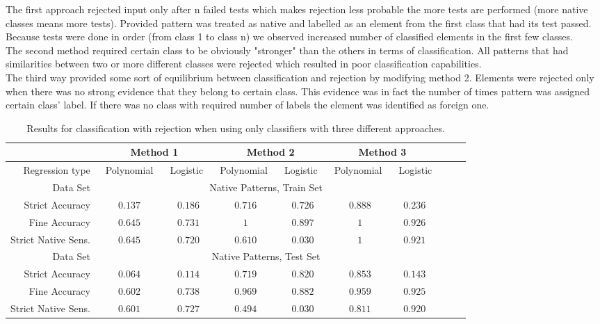 \documentclass{llncs}
\begin{document}
The first approach rejected input only after n failed tests which makes rejection less probable the more tests are performed (more native classes means more tests). Provided pattern was treated as native and labelled as an element from the first class that had its test passed. Because tests were done in order (from class 1 to class n) we observed increased number of classified elements in the first few classes.\\

The second method required certain class to be obviously "stronger" than the others in terms of classification. All patterns that had similarities between two or more different classes were rejected which resulted in poor classification capabilities. \\

The third way provided some sort of equilibrium between classification and rejection by modifying method 2. Elements were rejected only when there was no strong evidence that they belong to certain class. This evidence was in fact the number of times pattern was assigned certain class' label. If there was no class with required number of labels the element was identified as foreign one.

\begin{table}[!b]
	\vspace{-12pt}
	\centering
	\caption{Results for classification with rejection when using only classifiers with three different approaches.}
	\vspace{-6pt}
	\setlength{\tabcolsep}{3pt}
	\renewcommand{\arraystretch}{1}
	{\footnotesize
		\begin{tabular}{|r||c|c|c||c|c|c||c|c|c|}
			\hline
			& \multicolumn{2}{c||}{Method 1} & \multicolumn{2}{c||}{Method 2} & \multicolumn{2}{c|}{Method 3}\\
			\hline
			Regression type & $\;\;$Polynomial$\;\;$ & $\,$Logistic$\;\;$ & $\,$Polynomial$\;\;$ & $\,$Logistic$\;\;$ & $\,$Polynomial$\;\;$ & $\,$Logistic  \\
			\hline
			Data Set & \multicolumn{6}{c|}{Native Patterns, Train Set} \\
			\hline
			Strict Accuracy     & $0.137$ & $0.186$ & $0.716$ & $0.726$ & $0.888$ & $0.236$ \\
			Fine Accuracy       & $0.645$     & $0.731$ & $1$ & $0.897$ & $1$ & $0.926$ \\
			Strict Native Sens. & $0.645$ & $0.720$ & $0.610$ & $0.030$ & $1$ & $0.921$ \\
			\hline
			Data Set & \multicolumn{6}{c|}{Native Patterns, Test Set} \\
			\hline
			Strict Accuracy  & $0.064$ & $0.114$ & $0.719$ & $0.820$ & $0.853$ & $0.143$ \\
			Fine Accuracy       & $0.602$ & $0.738$ & $0.969$ & $0.882$ & $0.959$ & $0.925$ \\
			Strict Native Sens. & $0.601$ & $0.727$ & $0.494$ & $0.030$ & $0.811$ & $0.920$ \\
			\hline
		\end{tabular}
	}
	\vspace{-6pt}
	\label{tab:NativeNoForeign2}
\end{table}
\end{document}
